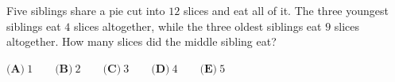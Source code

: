 Five siblings share a pie cut into $12$ slices and eat all of it. The three youngest siblings eat $4$ slices altogether, while the three oldest siblings eat $9$ slices altogether. How many slices did the middle sibling eat?

$\textbf{(A)}\ 1\qquad\textbf{(B)}\ 2\qquad\textbf{(C)}\ 3\qquad\textbf{(D)}\ 4\qquad\textbf{(E)}\ 5$

